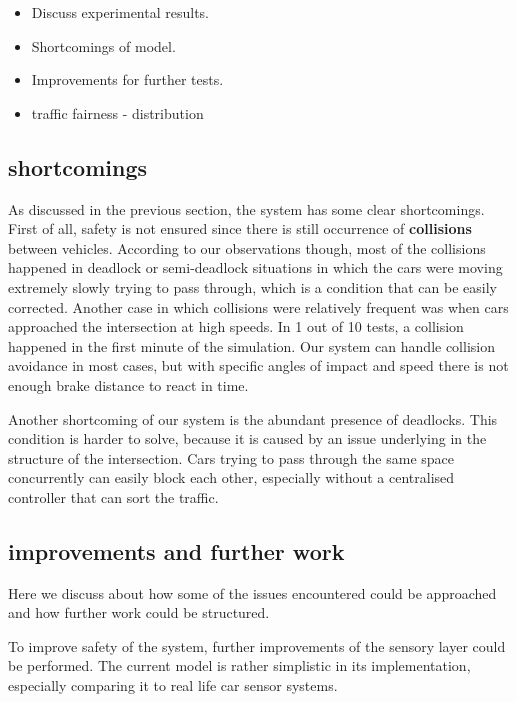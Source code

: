 \begin{itemize}
\item Discuss experimental results. ~
\item Shortcomings of model.
\item Improvements for further tests.
\item traffic fairness - distribution
\end{itemize}

  \subsection{shortcomings}
 
As discussed in the previous section, the system has some clear shortcomings.
First of all, safety is not ensured since there is still occurrence of \textbf{collisions} between vehicles.
According to our observations though, most of the collisions happened in deadlock or semi-deadlock situations in which the cars were moving extremely slowly trying to pass through, which is a condition that can be easily corrected.
Another case in which collisions were relatively frequent was when cars approached the intersection at high speeds.
In 1 out of 10 tests, a collision happened in the first minute of the simulation.
Our system can handle collision avoidance in most cases, but with specific angles of impact and speed there is not enough brake distance to react in time.
\newline

Another shortcoming of our system is the abundant presence of deadlocks.
This condition is harder to solve, because it is caused by an issue underlying in the structure of the intersection.
Cars trying to pass through the same space concurrently can easily block each other, especially without a centralised controller that can sort the traffic.

\subsection{improvements and further work}

Here we discuss about how some of the issues encountered could be approached and how further work could be structured.

To improve safety of the system, further improvements of the sensory layer could be performed.
The current model is rather simplistic in its implementation, especially comparing it to real life car sensor systems.
